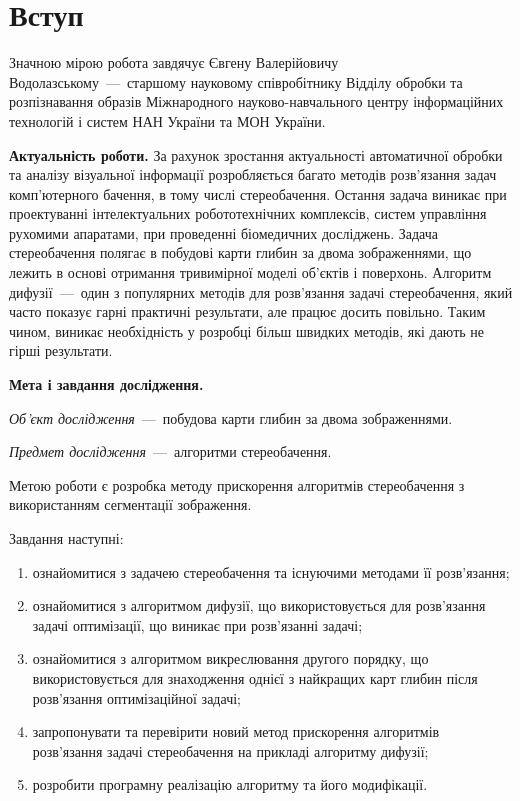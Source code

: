 \chapter*{Вступ}

Значною мірою робота завдячує Євгену Валерійовичу Водолазському~---~старшому
науковому співробітнику Відділу обробки та розпізнавання образів
Міжнародного науково-навчального центру інформаційних технологій
і систем НАН України та МОН України.

\textbf{Актуальність роботи.}
За рахунок зростання актуальності автоматичної обробки
та аналізу візуальної інформації розробляється багато методів
розв'язання задач комп'ютерного бачення, в тому числі стереобачення.
Остання задача виникає при проектуванні інтелектуальних робототехнічних
комплексів, систем управління рухомими апаратами,
при проведенні біомедичних досліджень.
Задача стереобачення полягає в побудові карти глибин за двома зображеннями,
що лежить в основі отримання тривимірної моделі об'єктів і поверхонь.
Алгоритм дифузії~---~один з популярних методів для розв'язання задачі
стереобачення, який часто показує гарні практичні результати,
але працює досить повільно.
Таким чином, виникає необхідність у розробці більш швидких методів,
які дають не гірші результати.

\textbf{Мета і завдання дослідження.}

\textit{Об'єкт дослідження}~---~побудова карти глибин за двома зображеннями.

\textit{Предмет дослідження}~---~алгоритми стереобачення.

Метою роботи є розробка методу прискорення алгоритмів стереобачення
з використанням сегментації зображення.

Завдання наступні:
\begin{enumerate}
  \item
    ознайомитися з задачею стереобачення та існуючими методами її розв'язання;
  \item
    ознайомитися з алгоритмом дифузії,
    що використовується для розв'язання задачі оптимізації,
    що виникає при розв'язанні задачі;
  \item
    ознайомитися з алгоритмом викреслювання другого порядку,
    що використовується для знаходження однієї з найкращих карт глибин
    після розв'язання оптимізаційної задачі;
  \item
    запропонувати та перевірити новий метод прискорення
    алгоритмів розв'язання задачі стереобачення на прикладі алгоритму дифузії;
  \item
    розробити програмну реалізацію алгоритму та його модифікації.
\end{enumerate}

